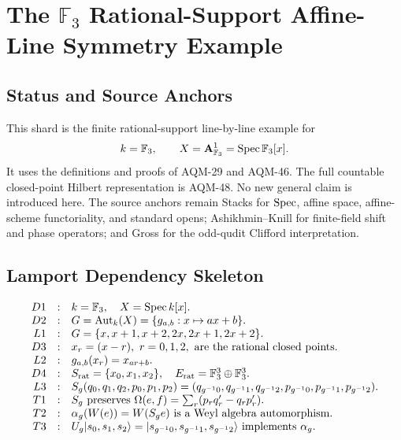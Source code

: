 
\section{The \texorpdfstring{\(\mathbb F_3\)}{F3} Rational-Support Affine-Line Symmetry Example}
\label{sec:f3-affine-line-symmetry-example}
\subsection{Status and Source Anchors}
This shard is the finite rational-support line-by-line example for
\[
  k=\mathbb F_3,\qquad X=\mathbf A^1_{\mathbb F_3}=\operatorname{Spec}\mathbb F_3[x].
\]
It uses the definitions and proofs of AQM-29 and AQM-46.  The full countable
closed-point Hilbert representation is AQM-48.  No new general claim is
introduced here.  The source anchors remain Stacks for
\(\operatorname{Spec}\), affine space, affine-scheme functoriality, and standard opens;
Ashikhmin--Knill for finite-field shift and phase operators; and Gross for
the odd-qudit Clifford interpretation.
\subsection{Lamport Dependency Skeleton}
\[
\begin{array}{rcl}
D1&:&k=\mathbb F_3,\quad X=\operatorname{Spec} k[x].\\
D2&:&G=\operatorname{Aut}_k(X)=\{g_{a,b}:x\mapsto ax+b\}.\\
L1&:&G=\{x,x+1,x+2,2x,2x+1,2x+2\}.\\
D3&:&x_r=(x-r),\ r=0,1,2,\text{ are the rational closed points}.\\
L2&:&g_{a,b}(x_r)=x_{ar+b}.\\
D4&:&S_{\rm rat}=\{x_0,x_1,x_2\},\quad
      E_{\rm rat}=\mathbb F_3^3\oplus\mathbb F_3^3.\\
L3&:&S_g(q_0,q_1,q_2,p_0,p_1,p_2)
      =(q_{g^{-1}0},q_{g^{-1}1},q_{g^{-1}2},
        p_{g^{-1}0},p_{g^{-1}1},p_{g^{-1}2}).\\
T1&:&S_g\text{ preserves }\Omega(e,f)=\sum_r(p_rq'_r-q_rp'_r).\\
T2&:&\alpha_g(W(e))=W(S_ge)\text{ is a Weyl algebra automorphism}.\\
T3&:&U_g|s_0,s_1,s_2\rangle=
      |s_{g^{-1}0},s_{g^{-1}1},s_{g^{-1}2}\rangle
      \text{ implements }\alpha_g.
\end{array}
\]
